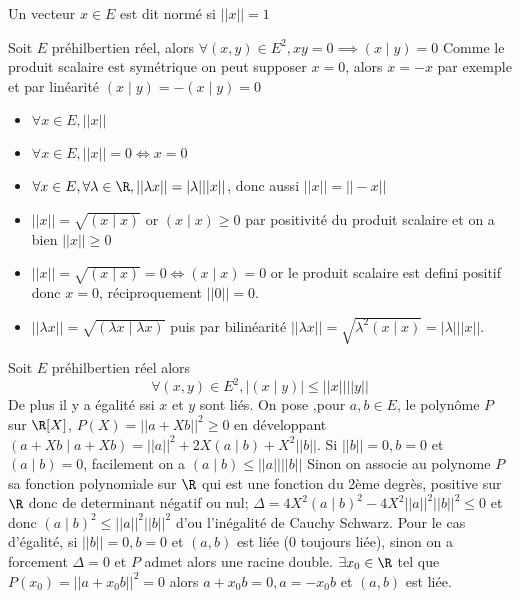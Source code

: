 \begin{defini}
    Un vecteur $x\in E$ est dit normé si $||x||=1$
\end{defini}
\begin{prop}
    Soit $E$ préhilbertien réel, alors $\forall(x,y)\in E^2, xy=0\implies (x\mid y)=0$
    \tcblower
    Comme le produit scalaire est symétrique on peut supposer $x=0$, alors $x=-x$ par exemple et par linéarité $(x\mid y)=-(x\mid y)=0$
\end{prop}
\begin{prop}
    \begin{itemize}
        \item $\forall x\in E, ||x||$
        \item $\forall x\in E, ||x||=0 \iff x=0$
        \item $ \forall x\in E, \forall \lambda \in \R, ||\lambda x||=|\lambda| ||x||$, donc aussi $||x||=||-x||$
    \end{itemize}
    \tcblower
    \begin{itemize}
        \item $||x||=\sqrt{(x\mid x)}$ or $(x\mid x)\geq 0$ par positivité du produit scalaire et on a bien $||x||\geq 0$
        \item $||x||=\sqrt{(x\mid x)}=0\iff (x\mid x)=0$ or le produit scalaire est defini positif donc $x=0$, réciproquement $||0||=0$.
        \item $||\lambda x||=\sqrt{(\lambda x\mid \lambda x)}$ puis par bilinéarité $||\lambda x||=\sqrt{\lambda^2( x\mid x)}=|\lambda| ||x||$.
    \end{itemize}
\end{prop}
\begin{prop}
    Soit $E$ préhilbertien réel alors $$\forall (x,y)\in E^2, |(x\mid y)|\leq ||x|| ||y||$$
    De plus il y a égalité ssi $x$ et $y$ sont liés.
    \tcblower
    On pose ,pour $a,b\in E$, le polynôme $P$ sur $\R [X]$, $P(X)=||a+Xb||^2\geq 0$ en développant $(a+Xb\mid a+Xb)=||a||^2+2X(a\mid b)+X^2||b||$.
    Si $||b||=0,b=0$ et $(a\mid b)=0$, facilement on a $(a\mid b)\leq ||a|| ||b||$
    Sinon on associe au polynome $P$ sa fonction polynomiale sur $\R$ qui est une fonction du 2ème degrès, positive sur $\R$ donc de determinant négatif ou nul; $\Delta = 4X^2(a\mid b)^2-4X^2||a||^2||b||^2\leq 0$ et donc $(a\mid b)^2\leq ||a||^2||b||^2$ d'ou l'inégalité de Cauchy Schwarz.
    Pour le cas d'égalité, si $||b||=0,b=0$ et $(a,b)$ est liée (0 toujours liée), sinon on a forcement $\Delta=0$ et $P$ admet alors une racine double. $\exists x_0\in \R$ tel que $P(x_0)=||a+x_0b||^2=0$ alors $a+x_0b=0,a=-x_0b$ et $(a,b)$ est liée.
\end{prop}
